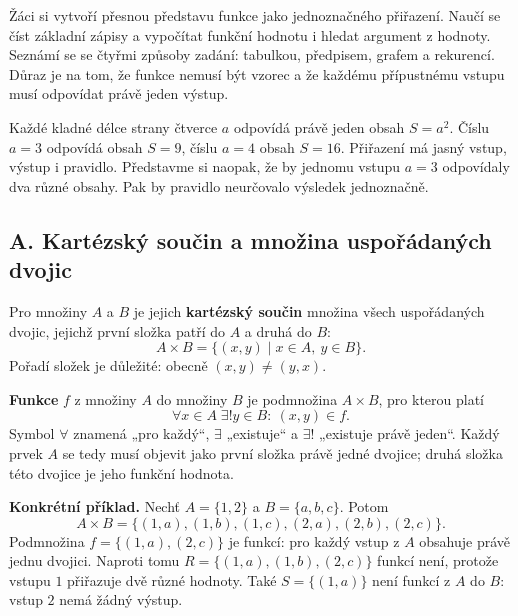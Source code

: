 \documentclass[11pt,a4paper]{article}
\begin{document}
Žáci si vytvoří přesnou představu funkce jako jednoznačného přiřazení. Naučí se číst základní zápisy a vypočítat funkční hodnotu i hledat argument z hodnoty. Seznámí se se čtyřmi způsoby zadání: tabulkou, předpisem, grafem a rekurencí. Důraz je na tom, že funkce nemusí být vzorec a že každému přípustnému vstupu musí odpovídat právě jeden výstup.


Každé kladné délce strany čtverce $a$ odpovídá právě jeden obsah $S=a^2$. Číslu $a=3$ odpovídá obsah $S=9$, číslu $a=4$ obsah $S=16$. Přiřazení má jasný vstup, výstup i pravidlo. Představme si naopak, že by jednomu vstupu $a=3$ odpovídaly dva různé obsahy. Pak by pravidlo neurčovalo výsledek jednoznačně.

\subsection*{A. Kartézský součin a množina uspořádaných dvojic}
\begin{definiceBox}
Pro množiny $A$ a $B$ je jejich \textbf{kartézský součin} množina všech uspořádaných dvojic, jejichž první složka patří do $A$ a druhá do $B$:
\[
A\times B=\{(x,y)\mid x\in A,\ y\in B\}.
\]
Pořadí složek je důležité: obecně $(x,y)\ne(y,x)$.
\end{definiceBox}

\begin{definiceBox}
\textbf{Funkce} $f$ z množiny $A$ do množiny $B$ je podmnožina $A\times B$, pro kterou platí
\[
\forall x\in A\;\exists!y\in B:\ (x,y)\in f.
\]
Symbol $\forall$ znamená „pro každý“, $\exists$ „existuje“ a $\exists!$ „existuje právě jeden“. Každý prvek $A$ se tedy musí objevit jako první složka právě jedné dvojice; druhá složka této dvojice je jeho funkční hodnota.
\end{definiceBox}

\textbf{Konkrétní příklad.} Nechť $A=\{1,2\}$ a $B=\{a,b,c\}$. Potom
\[
A\times B=\{(1,a),(1,b),(1,c),(2,a),(2,b),(2,c)\}.
\]
Podmnožina $f=\{(1,a),(2,c)\}$ je funkcí: pro každý vstup z $A$ obsahuje právě jednu dvojici. Naproti tomu $R=\{(1,a),(1,b),(2,c)\}$ funkcí není, protože vstupu $1$ přiřazuje dvě různé hodnoty. Také $S=\{(1,a)\}$ není funkcí z $A$ do $B$: vstup $2$ nemá žádný výstup.
\end{document}
